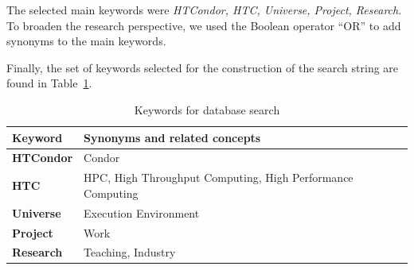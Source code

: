 The selected main keywords were \textit{HTCondor, HTC, Universe, Project, Research}. To broaden the research perspective, we used the Boolean operator ``OR'' to add synonyms to the main keywords.

Finally, the set of keywords selected for the construction of the search string are found in Table~\ref{table:database_search_keywords}.


\begin{table}[htbp]
	\centering
	\caption{Keywords for database search}
	\label{table:database_search_keywords}
	\renewcommand{\arraystretch}{1}  %
	\begin{tabular}{p{1.4cm}p{6.4cm}}
		\toprule
		\textbf{Keyword}  & \textbf{Synonyms and related concepts}                \\
		\midrule
		\textbf{HTCondor} & Condor                                                     \\
		\addlinespace[0.8em]
		\textbf{HTC}      & HPC, High Throughput Computing, High Performance Computing \\
		\addlinespace[0.8em]
		\textbf{Universe} & Execution Environment                                      \\
		\addlinespace[0.8em]
		\textbf{Project}  & Work                                                       \\
		\addlinespace[0.8em]
		\textbf{Research} & Teaching, Industry                                         \\
		\bottomrule
	\end{tabular}
\end{table}





